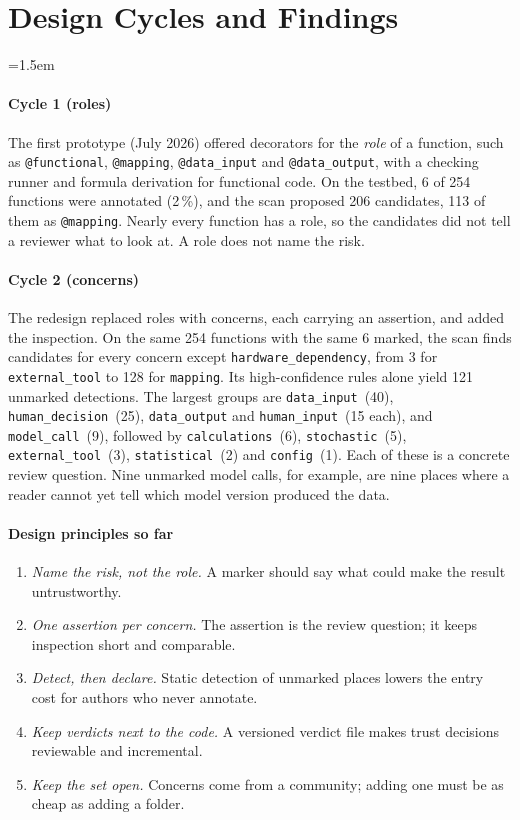 \documentclass[conference,10pt]{IEEEtran}
\newcommand{\cc}[1]{\texttt{#1}}
\begin{document}
\section{Design Cycles and Findings}
\emergencystretch=1.5em
\paragraph*{Cycle 1 (roles)} The first prototype (July 2026) offered decorators for the \emph{role} of a function, such as \cc{@functional}, \cc{@mapping}, \cc{@data\_input} and \cc{@data\_output}, with a checking runner and formula derivation for functional code. On the testbed, 6 of 254 functions were annotated (2\,\%), and the scan proposed 206 candidates, 113 of them as \cc{@mapping}. Nearly every function has a role, so the candidates did not tell a reviewer what to look at. A role does not name the risk.

\paragraph*{Cycle 2 (concerns)} The redesign replaced roles with concerns, each carrying an assertion, and added the inspection. On the same 254 functions with the same 6 marked, the scan finds candidates for every concern except \cc{hardware\_dependency}, from 3 for \cc{external\_tool} to 128 for \cc{mapping}. Its high-confidence rules alone yield 121 unmarked detections. The largest groups are \cc{data\_input}~(40), \cc{human\_decision}~(25), \cc{data\_output} and \cc{human\_input}~(15 each), and \cc{model\_call}~(9), followed by \cc{calculations}~(6), \cc{stochastic}~(5), \cc{external\_tool}~(3), \cc{statistical}~(2) and \cc{config}~(1). Each of these is a concrete review question. Nine unmarked model calls, for example, are nine places where a reader cannot yet tell which model version produced the data.

\paragraph*{Design principles so far}
\begin{enumerate}
\item[DP1] \emph{Name the risk, not the role.} A marker should say what could make the result untrustworthy.
\item[DP2] \emph{One assertion per concern.} The assertion is the review question; it keeps inspection short and comparable.
\item[DP3] \emph{Detect, then declare.} Static detection of unmarked places lowers the entry cost for authors who never annotate.
\item[DP4] \emph{Keep verdicts next to the code.} A versioned verdict file makes trust decisions reviewable and incremental.
\item[DP5] \emph{Keep the set open.} Concerns come from a community; adding one must be as cheap as adding a folder.
\end{enumerate}
\end{document}
